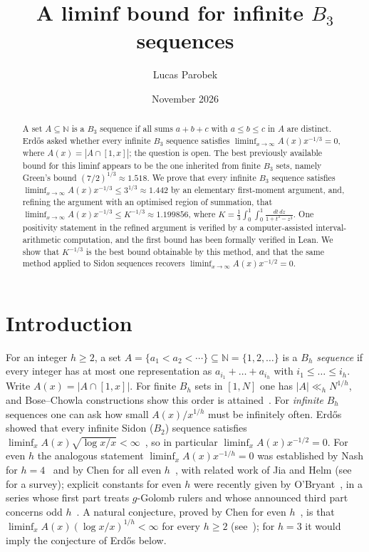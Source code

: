 \documentclass[11pt]{amsart}
\title{A liminf bound for infinite $B_3$ sequences}
\author{Lucas Parobek}
\date{November 2026}
\theoremstyle{remark}
\newcommand{\N}{\mathbb{N}}
\begin{document}
\begin{abstract}
A set $A\subseteq\N$ is a $B_3$ sequence if all sums $a+b+c$ with $a\le b\le c$ in $A$ are distinct.
Erd\H{o}s asked whether every infinite $B_3$ sequence satisfies $\liminf_{x\to\infty}A(x)x^{-1/3}=0$, where $A(x)=|A\cap[1,x]|$; the question is open.
The best previously available bound for this liminf appears to be the one inherited from finite $B_3$ sets, namely Green's bound $(7/2)^{1/3}\approx1.518$.
We prove that every infinite $B_3$ sequence satisfies
$\liminf_{x\to\infty}A(x)x^{-1/3}\le 3^{1/3}\approx1.442$ by an elementary first-moment argument,
and, refining the argument with an optimised region of summation, that
$\liminf_{x\to\infty}A(x)x^{-1/3}\le K^{-1/3}\approx1.199856$, where $K=\frac13\int_0^1\!\int_0^1\frac{dt\,dz}{1+t^3-z^3}$.
One positivity statement in the refined argument is verified by a computer-assisted interval-arithmetic computation, and the first bound has been formally verified in Lean.
We show that $K^{-1/3}$ is the best bound obtainable by this method, and that the same method applied to Sidon sequences recovers $\liminf_{x\to\infty}A(x)x^{-1/2}=0$.
\end{abstract}

\maketitle

\section{Introduction}

For an integer $h\ge2$, a set $A=\{a_1<a_2<\cdots\}\subseteq\N=\{1,2,\dots\}$ is a \emph{$B_h$ sequence} if every integer has at most one representation as $a_{i_1}+\dots+a_{i_h}$ with $i_1\le\dots\le i_h$. Write $A(x)=|A\cap[1,x]|$.
For finite $B_h$ sets in $[1,N]$ one has $|A|\ll_h N^{1/h}$, and Bose--Chowla constructions show this order is attained~\cite{BoseChowla}.
For \emph{infinite} $B_h$ sequences one can ask how small $A(x)/x^{1/h}$ must be infinitely often.
Erd\H{o}s showed that every infinite Sidon ($B_2$) sequence satisfies $\liminf_{x}A(x)\sqrt{\log x/x}<\infty$~\cite{Stohr,HalberstamRoth}, so in particular $\liminf_x A(x)x^{-1/2}=0$.
For even $h$ the analogous statement $\liminf_x A(x)x^{-1/h}=0$ was established by Nash for $h=4$~\cite{Nash} and by Chen for all even $h$~\cite{Chen}, with related work of Jia and Helm (see~\cite{Graham} for a survey); explicit constants for even $h$ were recently given by O'Bryant~\cite{OBryant}, in a series whose first part treats $g$-Golomb rulers and whose announced third part concerns odd $h$~\cite{OBryantI}.
A natural conjecture, proved by Chen for even $h$~\cite{Chen}, is that $\liminf_x A(x)(\log x/x)^{1/h}<\infty$ for every $h\ge2$ (see~\cite[\S9]{Graham}); for $h=3$ it would imply the conjecture of Erd\H{o}s below.
\end{document}
